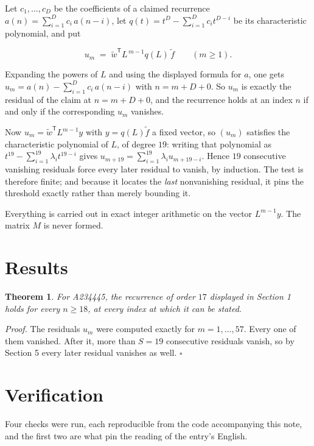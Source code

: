 \documentclass[11pt]{article}
\newtheorem{theorem}{Theorem}
\theoremstyle{definition}
\begin{document}
Let $c_1,\dots,c_D$ be the coefficients of a claimed recurrence $a(n) = \sum_{i=1}^{D} c_i\,a(n-i)$, let $q(t) = t^{D} - \sum_{i=1}^{D} c_i t^{D-i}$ be its characteristic polynomial, and put

\[u_m \;=\; \tilde w^{\mathsf T} L^{\,m-1} q(L)\,\tilde f \qquad (m \ge 1).\]

Expanding the powers of $L$ and using the displayed formula for $a$, one gets $u_m = a(n) - \sum_{i=1}^{D} c_i\,a(n-i)$ with $n = m + D + 0$. So $u_m$ is exactly the residual of the claim at $n = m + D + 0$, and the recurrence holds at an index $n$ if and only if the corresponding $u_m$ vanishes.

Now $u_m = \tilde w^{\mathsf T} L^{m-1} y$ with $y = q(L)\tilde f$ a fixed vector, so $(u_m)$ satisfies the characteristic polynomial of $L$, of degree $19$: writing that polynomial as $t^{19} - \sum_{i=1}^{19} \lambda_i t^{19-i}$ gives $u_{m+19} = \sum_{i=1}^{19} \lambda_i u_{m+19-i}$. Hence $19$ consecutive vanishing residuals force every later residual to vanish, by induction. The test is therefore finite; and because it locates the {\itshape last} nonvanishing residual, it pins the threshold exactly rather than merely bounding it.

Everything is carried out in exact integer arithmetic on the vector $L^{m-1}y$. The matrix $M$ is never formed.

\section{Results}

\begin{theorem} For A234445, the recurrence of order $17$ displayed in Section 1 holds for every $n \ge 18$, at every index at which it can be stated.\end{theorem}

{\itshape Proof.} The residuals $u_m$ were computed exactly for $m = 1,\dots,57$. Every one of them vanished. After it, more than $S = 19$ consecutive residuals vanish, so by Section 5 every later residual vanishes as well. $\square$

\section{Verification}

Four checks were run, each reproducible from the code accompanying this note, and the first two are what pin the reading of the entry's English.
\end{document}
